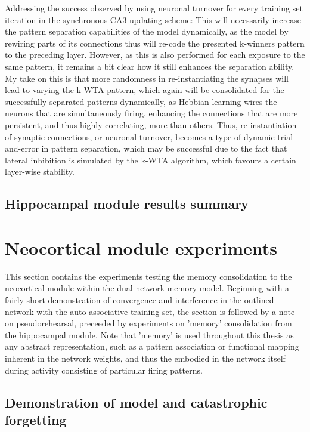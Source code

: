 Addressing the success observed by using neuronal turnover for every training set iteration in the synchronous CA3 updating scheme: 
This will necessarily increase the pattern separation capabilities of the model dynamically, as the model by rewiring parts of its connections thus will re-code the presented k-winners pattern to the preceding layer. However, as this is also performed for each exposure to the same pattern, it remains a bit clear how it still enhances the separation ability. My take on this is that more randomness in re-instantiating the synapses will lead to varying the k-WTA pattern, which again will be consolidated for the successfully separated patterns dynamically, as Hebbian learning wires the neurons that are simultaneously firing, enhancing the connections that are more persistent, and thus highly correlating, more than others. Thus, re-instantiation of synaptic connections, or neuronal turnover, becomes a type of dynamic trial-and-error in pattern separation, which may be successful due to the fact that lateral inhibition is simulated by the k-WTA algorithm, which favours a certain layer-wise stability.

\subsection{Hippocampal module results summary}



\section{Neocortical module experiments}

This section contains the experiments testing the memory consolidation to the neocortical module within the dual-network memory model. Beginning with a fairly short demonstration of convergence and interference in the outlined network with the auto-associative training set, the section is followed by a note on pseudorehearsal, preceeded by experiments on 'memory' consolidation from the hippocampal module. Note that 'memory' is used throughout this thesis as any abstract representation, such as a pattern association or functional mapping inherent in the network weights, and thus the embodied in the network itself during activity consisting of particular firing patterns.

\subsection{Demonstration of model and catastrophic forgetting}

